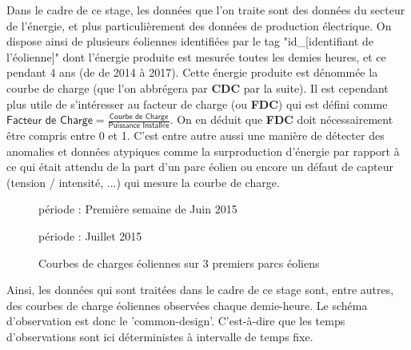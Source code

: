 
Dans le cadre de ce stage, les données que l'on traite sont des données du secteur de l'énergie, et plus particulièrement des données de production électrique. On dispose ainsi de plusieurs éoliennes identifiées par le tag "id\_[identifiant de l'éolienne]" dont l'énergie produite est mesurée toutes les demies heures, et ce pendant 4 ans (de de 2014 à 2017). 
Cette énergie produite est dénommée la courbe de charge (que l'on abbrégera par \textbf{CDC} par la suite). Il est cependant plus utile de s'intéresser au facteur de charge (ou \textbf{FDC}) qui est défini comme 
$\displaystyle\textsf{Facteur de Charge} = \frac{\textsf{Courbe de Charge}}{\textsf{Puissance Installée}}$.
On en déduit que \textbf{FDC} doit nécessairement être compris entre 0 et 1. C'est entre autre aussi une manière de détecter des anomalies et données atypiques comme la surproduction d'énergie par rapport à ce qui était attendu de la part d'un parc éolien ou encore un défaut de capteur (tension / intensité, ...) qui mesure la courbe de charge.

\begin{figure}[H]
    \centering
    période : Première semaine de Juin 2015
    

    période : Juillet 2015
        
    \caption{Courbes de charges éoliennes sur 3 premiers parcs éoliens}
    \label{fig:courbes_de_charge}
\end{figure}

Ainsi, les données qui sont traitées dans le cadre de ce stage sont, entre autres, des courbes de charge éoliennes observées chaque demie-heure. Le schéma d’observation est donc le 'common-design'. C'est-à-dire que les temps d'observations sont ici déterministes à intervalle de temps fixe.